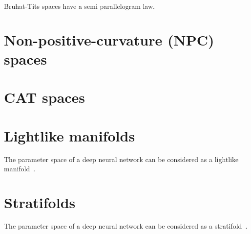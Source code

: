\documentclass[11pt]{article}
\begin{document}
Bruhat-Tits spaces have a semi parallelogram law.



\section*{Non-positive-curvature (NPC) spaces}


\section*{CAT spaces}

\section*{Lightlike manifolds}

The parameter space of a deep neural network can be considered as a lightlike manifold~\cite{sun2019geometric}.

\section*{Stratifolds}

The parameter space of a deep neural network can be considered as a stratifold~\cite{esser2022influence}.



\end{document}
